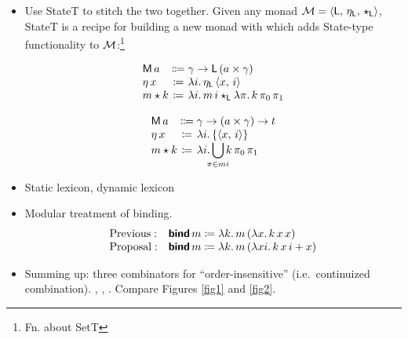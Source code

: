 \begin{itemize}
	\item Use StateT to stitch the two together. Given any monad ${\cal M}= \langle \textsf{L},\,\eta_\textsf{L},\,\star_\textsf{L} \rangle$, StateT is a recipe for building a new monad with which adds State-type functionality to ${\cal M}$:\footnote{Fn. about SetT}%
	\begin{defi}\label{statet}
		\[\begin{array}[t]
			{@{}l@{}c@{}l@{}}
			\textsf{M}\,a &{}\Coloneqq{} &\gamma \ra \textsf{L}\,(a \times \gamma)%
			\\
			\eta\,x &{}\ceq{} &\lambda i .\,\eta_\textsf{L}\,\ab{x,\,i}
			\\
			m \star k &{}\ceq{} &\lambda i.\, m\,i\star_\textsf{L} \lambda \pi.\,k\,\pi_0\,\pi_1%
		\end{array}\]
	\end{defi}
	\begin{defi}\label{stateset}
		\[\begin{array}[t]
			{@{}l@{}c@{}l@{}}
			\textsf{M}\,a &{}\Coloneqq{} &\gamma \ra (a \times \gamma) \ra t%
			\\
			\eta\,x &{}\ceq{} &\lambda i.\left\{\ab{x,\,i}\right\}
			\\
			m \star k &{}\ceq{} &\lambda i.\displaystyle\bigcup_{\mathclap{\pi \in mi}}k\,\pi_0\,\pi_1%
		\end{array}\]
	\end{defi}

	\item Static lexicon, dynamic lexicon
	
	\item Modular treatment of binding.%
	\[\begin{array}{ll}
		\text{Previous}:& \bsf{bind}\,m \ceq \lambda k.\,m\,(\lambda x.\,k\,x\,x)%
		\\
		\text{Proposal}:& \bsf{bind}\,m \ceq \lambda k.\,m\,(\lambda xi.\,k\,x\,i + x)%
	\end{array}\]
	
	\item Summing up: three combinators for ``order-insensitive'' (i.e.~continuized combination). , , . Compare Figures \ref{fig1} and \ref{fig2}.%
\end{itemize}

